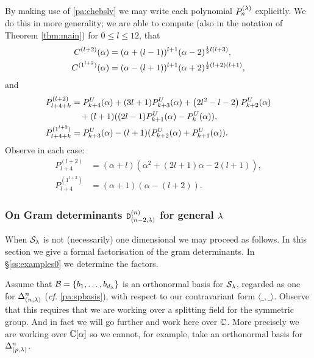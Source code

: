 {\mdef   \label{pa:able}
By making use of \ref{pa:chebslv} we may write each polynomial $P_n^{(\lambda)}$ explicitly. 
We do this in more generality; we are able to compute 
(also in the notation of Theorem \ref{thm:main}) 
for $0\leq l\leq 12$, that
\begin{align*}
    C^{(l+2)}(\alpha)&=(\alpha+(l-1))^{l+1}(\alpha-2)^{\frac{1}{2}l(l+3)},\\
    C^{(1^{l+2})}(\alpha)&=(\alpha-(l+1))^{l+1}(\alpha+2)^{\frac{1}{2}(l+2)(l+1)},
\end{align*}
and
\begin{align*}P^{(l+2)}_{l+4+k}&=P_{k+4}^U(\alpha)+(3 l+1) P_{k+3}^U(\alpha)+
\left(2 l^2-l-2\right)P_{k+2}^U(\alpha)\\
&\quad+(l+1)((2l-1)P^U_{k+1}(\alpha)-P^U_{k}(\alpha)),\\
P^{(1^{l+2})}_{l+4+k}&=P_{k+3}^U(\alpha)-(l+1)(P_{k+2}^U(\alpha)+P_{k+1}^U(\alpha)).\end{align*}
Observe in each case:
\begin{align}
    P^{(l+2)}_{l+4}&=(\alpha +l) \left(\alpha ^2+(2l+1)\alpha -2(l+1)\right), \label{eq:row0}\\
    P^{(1^{l+2})}_{l+4}&=(\alpha +1) (\alpha- (l+2) ). \label{eq:col0}
\end{align}}



\subsubsection{On Gram determinants ${\mathtt D}^{(n)}_{(n-2,\lambda)}$ 
for general $\lambda$
}\label{ss:non1dsp}

When $\mathcal{S}_\lambda$ is not (necessarily) one dimensional we may proceed as follows. 
In this section we give a formal factorisation of the gram determinants. 
In \S\ref{ss:examples0} we determine the factors. 


\mdef 
Assume that $\mathcal{B}=\{b_1,\dots, b_{d_\lambda}\}$ is an orthonormal basis for 
$\mathcal{S}_\lambda$, regarded as one for $\Delta^n_{(n,\lambda)}$ (\textit{cf.} \ref{pa:spbasis}),
with respect to our contravariant form $\langle \_ , \_ \rangle$. Observe that this requires that we are working over a splitting field for the symmetric group. And in fact we will go further and work here over $\mathbb{C}$. More precisely we are working over $\mathbb{C}[\alpha]$ so we cannot, for example, take an orthonormal basis for $\Delta^{n}_{(p,\lambda)}$.

